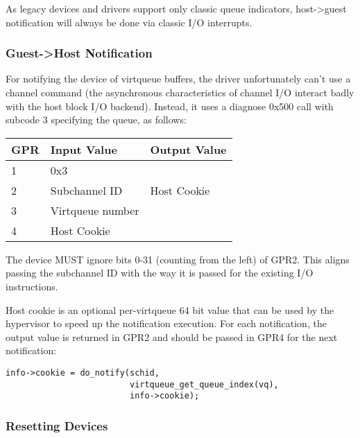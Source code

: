 As legacy devices and drivers support only classic queue indicators,
host->guest notification will always be done via classic I/O interrupts.

\subsubsection{Guest->Host Notification}\label{sec:Virtio Transport Options / Virtio over channel I/O / Device Operation / Guest->Host Notification}

For notifying the device of virtqueue buffers, the driver
unfortunately can't use a channel command (the asynchronous
characteristics of channel I/O interact badly with the host block
I/O backend). Instead, it uses a diagnose 0x500 call with subcode
3 specifying the queue, as follows:

\begin{tabular}{ |l|l|l| }
\hline
GPR  &   Input Value     & Output Value \\
\hline \hline
  1   &       0x3         &              \\
\hline
  2   &  Subchannel ID    & Host Cookie  \\
\hline
  3   & Virtqueue number  &              \\
\hline
  4   &   Host Cookie     &              \\
\hline
\end{tabular}

The device MUST ignore bits 0-31 (counting from the left) of GPR2.
This aligns passing the subchannel ID with the way it is passed
for the existing I/O instructions.

Host cookie is an optional per-virtqueue 64 bit value that can be
used by the hypervisor to speed up the notification execution.
For each notification, the output value is returned in GPR2 and
should be passed in GPR4 for the next notification:

\begin{lstlisting}
info->cookie = do_notify(schid,
                         virtqueue_get_queue_index(vq),
                         info->cookie);
\end{lstlisting}

\subsubsection{Resetting Devices}\label{sec:Virtio Transport Options / Virtio over channel I/O / Device Operation / Resetting Devices}

